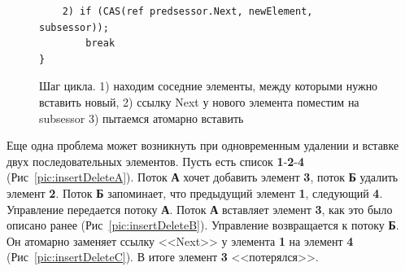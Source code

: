 \documentclass[12pt]{report}
\begin{document}
{\begin{figure}[h]
\begin{lstlisting}
	2) if (CAS(ref predsessor.Next, newElement, subsessor));
		break
}
			\end{lstlisting}
			\caption{Шаг цикла. 1) находим соседние элементы, между которыми нужно вставить новый, 2) ссылку Next у нового элемента поместим на subsessor 3) пытаемся атомарно вставить}
			\label{pic:whileCas}
		\end{figure}
		\par Еще одна проблема может возникнуть при одновременным удалении и вставке двух последовательных элементов. Пусть есть список \textbf{1}-\textbf{2}-\textbf{4} (Рис~\ref{pic:insertDeleteA}). Поток \textbf{А} хочет добавить элемент \textbf{3}, поток \textbf{Б} удалить элемент \textbf{2}. Поток \textbf{Б} запоминает, что предыдущий элемент \textbf{1}, следующий \textbf{4}. Управление передается потоку \textbf{А}. Поток \textbf{А} вставляет элемент \textbf{3}, как это было описано ранее (Рис~\ref{pic:insertDeleteB}). Управление возвращается к потоку \textbf{Б}. Он атомарно заменяет ссылку <<Next>> у элемента \textbf{1} на элемент \textbf{4} (Рис~\ref{pic:insertDeleteC}). В итоге элемент \textbf{3} <<потерялся>>.
		\begin{figure}[h!]
			\begin{minipage}[h]{0.45\linewidth}
				\center  {}
			\end{minipage}
			\hfill
			\begin{minipage}[h]{0.45\linewidth}
				\center {}
			\end{minipage}
			\vfill
			\begin{minipage}[h]{0.45\linewidth}
				\center {}
\end{minipage}
\end{figure}}
\end{document}
